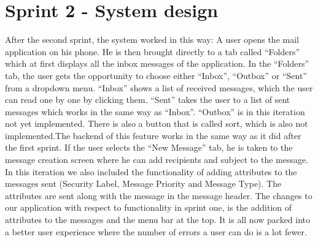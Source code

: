 \section{Sprint 2 - System design}
After the second sprint, the system worked in this way: A user opens the mail application on his phone. He is then brought directly to a tab called “Folders” which at first displays all the inbox messages of the application.
\newline
\newline
In the “Folders” tab, the user gets the opportunity to choose either “Inbox”, “Outbox” or “Sent” from a dropdown menu. “Inbox” shows a list of received messages, which the user can read one by one by clicking them. “Sent” takes the user to a list of sent messages which works in the same way as “Inbox”. “Outbox” is in this iteration not yet implemented. There is also a button that is called sort, which is also not implemented.The backend of this feature works in the same way as it did after the first sprint. 
\newline
\newline
If the user selects the “New Message” tab, he is taken to the message creation screen where he can add recipients and subject to the message. In this iteration we also included the functionality of adding attributes to the messages sent (Security Label, Message Priority and Message Type). The attributes are sent along with the message in the message header.
\newline
\newline
The changes to our application with respect to functionality in sprint one, is the addition of attributes to the messages and the menu bar at the top. It is all now packed into a better user experience where the number of errors a user can do is a lot fewer. 
